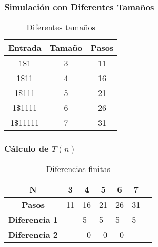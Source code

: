 \documentclass{uc3mpracticas}
\begin{document}
  \subsubsection{Simulación con Diferentes Tamaños}

  \begin{table}[!h]
    \centering
  \begin{tabular}{|c|c|c|}
  \hline
  \textbf{Entrada} & \textbf{Tamaño} & \textbf{Pasos} \\ \hline
  1\$1    & 3               & 11             \\ \hline
  1\$11   & 4               & 16             \\ \hline
  1\$111  & 5               & 21             \\ \hline
  1\$1111 & 6               & 26             \\ \hline
  1\$11111         & 7               & 31             \\ \hline
  \end{tabular}
  \caption{Diferentes tamaños}
  \end{table}


  \subsubsection{Cálculo de $T(n)$}


  \begin{table}[!h]
    \centering
  \begin{tabular}{|c|p{1cm}|p{1cm}|p{1cm}|p{1cm}|p{1cm}|p{1cm}|}
  \hline
  \textbf{N}     & \multicolumn{1}{c|}{\textbf{3}} & \multicolumn{1}{c|}{\textbf{4}} & \multicolumn{1}{c|}{\textbf{5}} & \multicolumn{1}{c|}{\textbf{6}} & \multicolumn{1}{c|}{\textbf{7}} \\ \hline
  \textbf{Pasos} & \multicolumn{1}{c|}{11}          & \multicolumn{1}{c|}{16}          & \multicolumn{1}{c|}{21}         & \multicolumn{1}{c|}{26}         & \multicolumn{1}{c|}{31} \\ \hline
  \textbf{Diferencia 1}                  &                                                         & 5                                                       & 5                               & 5                              &   5                           \\ \hline
  \textbf{Diferencia 2}                  &                                                         & \multicolumn{1}{r|}{0}                                  & \multicolumn{1}{r|}{0}          & \multicolumn{1}{r|}{0}       &                         \\ \hline
  \end{tabular}
  \caption{Diferencias finitas}
  \end{table}
\end{document}
